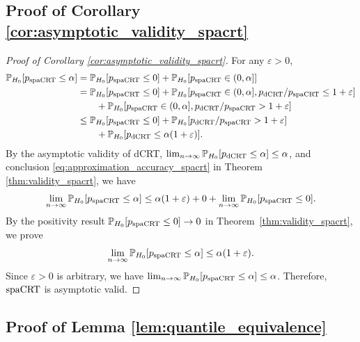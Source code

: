 \documentclass[12pt]{article}
\theoremstyle{definition}
\def\P{\mathbb{P}}
\def\P{\mathbb{P}}
\renewcommand{\P}{\mathbb{P}}							%
\newcommand{\dCRT}{\textnormal{dCRT}} 					%
\newcommand{\spacrt}{\textnormal{spaCRT}}               %
\begin{document}
  \subsection{Proof of Corollary \ref{cor:asymptotic_validity_spacrt}}

  \begin{proof}[Proof of Corollary \ref{cor:asymptotic_validity_spacrt}]
    
    For any $\varepsilon>0$,
    \begin{align*}
      \P_{H_0}[p_{\spacrt}\leq \alpha]
      &
      =\P_{H_0}[p_{\spacrt}\leq 0]+\P_{H_0}[p_{\spacrt}\in (0,\alpha]]\\
      &
      =\P_{H_0}[p_{\spacrt}\leq 0]+\P_{H_0}[p_{\spacrt}\in (0,\alpha],p_{\dCRT}/p_{\spacrt}\leq 1+\varepsilon]\\
      &
      \qquad+\P_{H_0}[p_{\spacrt}\in (0,\alpha],p_{\dCRT}/p_{\spacrt}> 1+\varepsilon]\\
      &
      \leq \P_{H_0}[p_{\spacrt}\leq 0]+\P_{H_0}[p_{\dCRT}/p_{\spacrt}> 1+\varepsilon]\\
      &
      \qquad+\P_{H_0}[p_{\dCRT}\leq\alpha(1+\varepsilon)].
    \end{align*}
    By the asymptotic validity of dCRT, $\lim_{n\rightarrow\infty}\P_{H_0}[p_{\dCRT}\leq\alpha]\leq\alpha$, and conclusion \eqref{eq:approximation_accuracy_spacrt} in Theorem \ref{thm:validity_spacrt}, we have 
    \begin{align*}
      \lim_{n\rightarrow\infty}\P_{H_0}[p_{\spacrt}\leq\alpha]\leq \alpha(1+\varepsilon) + 0 + \lim_{n\rightarrow\infty}\P_{H_0}[p_{\spacrt}\leq 0].
    \end{align*}
    By the positivity result $\P_{H_0}[p_{\spacrt}\leq 0]\rightarrow 0$ in Theorem~\ref{thm:validity_spacrt}, we prove 
    \begin{align*}
      \lim_{n\rightarrow\infty}\P_{H_0}[p_{\spacrt}\leq\alpha]\leq \alpha(1+\varepsilon).
    \end{align*}
    Since $\varepsilon>0$ is arbitrary, we have $\lim_{n\rightarrow\infty}\P_{H_0}[p_{\spacrt}\leq \alpha]\leq \alpha$. Therefore, $\spacrt$ is asymptotic valid.

  \end{proof}


  \subsection{Proof of Lemma \ref{lem:quantile_equivalence}}
  
\end{document}
